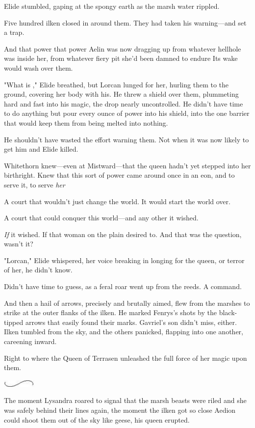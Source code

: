 Elide stumbled, gaping at the spongy earth as the marsh water rippled.

Five hundred ilken closed in around them. They had taken his warning---and set a trap.

And that power  that power Aelin was now dragging up from whatever hellhole was inside her, from whatever fiery pit she'd been damned to endure  Its wake would wash over them.

"What is  ," Elide breathed, but Lorcan lunged for her, hurling them to the ground, covering her body with his. He threw a shield over them, plummeting hard and fast into his magic, the drop nearly uncontrolled. He didn't have time to do anything but pour every ounce of power into his shield, into the one barrier that would keep them from being melted into nothing.

He shouldn't have wasted the effort warning them. Not when it was now likely to get him and Elide killed.

Whitethorn knew---even at Mistward---that the queen hadn't yet stepped into her birthright. Knew that this sort of power came around once in an eon, and to serve it, to serve \emph{her} 

A court that wouldn't just change the world. It would start the world over.

A court that could conquer this world---and any other it wished.

\emph{If} it wished. If that woman on the plain desired to. And that was the question, wasn't it?

"Lorcan," Elide whispered, her voice breaking in longing for the queen, or terror of her, he didn't know.

Didn't have time to guess, as a feral roar went up from the reeds. A command.

And then a hail of arrows, precisely and brutally aimed, flew from the marshes to strike at the outer flanks of the ilken. He marked Fenrys's shots by the black-tipped arrows that easily found their marks. Gavriel's son didn't miss, either. Ilken tumbled from the sky, and the others panicked, flapping into one another, careening inward.

Right to where the Queen of Terrasen unleashed the full force of her magic upon them.

\includegraphics[width=0.65in,height=0.13in]{images/seperator}

The moment Lysandra roared to signal that the marsh beasts were riled and she was safely behind their lines again, the moment the ilken got so close Aedion could shoot them out of the sky like geese, his queen erupted.


